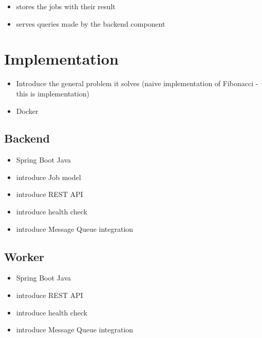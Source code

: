 \begin{itemize}
	\item stores the jobs with their result 
	\item serves queries made by the backend component
\end{itemize}

\section{Implementation}

\begin{itemize}
	\item Introduce the general problem it solves (naive implementation of Fibonacci - this is implementation)
	\item Docker
\end{itemize}

\subsection{Backend}

\begin{itemize}
	\item Spring Boot Java
	\item introduce Job model
	\item introduce REST API
	\item introduce health check
	\item introduce Message Queue integration
\end{itemize}

\subsection{Worker}

\begin{itemize}
	\item Spring Boot Java
	\item introduce REST API
	\item introduce health check
	\item introduce Message Queue integration
\end{itemize}

